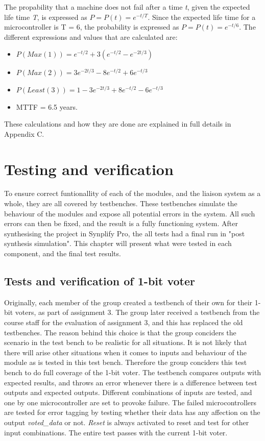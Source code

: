 \documentclass[a4paper]{IEEEtran}
\begin{document}
The propability that a machine does not fail after a time \textit{t}, given the expected life time \textit{T}, is expressed as $P = P(t) = e^{-t/T}$.
Since the expected life time for a microcontroller is T = 6, the probability is expressed as $P = P(t) = e^{-t/6}$. 
The different expressions and values that are calculated are:
\begin{itemize}
    \item $P(Max(1)) = e^{-t/2}+3(e^{-t/2}-e^{-2t/3})$
    \item $P(Max(2)) = 3e^{-2t/3}-8e^{-t/2}+6e^{-t/3}$
    \item $P(Least(3)) = 1-3e^{-2t/3}+8e^{-t/2}-6e^{-t/3}$
    \item MTTF = 6.5 years.
\end{itemize}

These calculations and how they are done are explained in full details in Appendix C.

\section{ Testing and verification }
To ensure correct funtionallity of each of the modules, and the liaison system as a whole, they are all covered by testbenches.
These testbenches simulate the behaviour of the modules and expose all potential errors in the system.
All such errors can then be fixed, and the result is a fully functioning system.
After synthesising the project in Synplify Pro, the all tests had a final run in "post synthesis simulation".
This chapter will present what were tested in each component, and the final test results.

\subsection{ Tests and verification of 1-bit voter}
Originally, each member of the group created a testbench of their own for their 1-bit voters, as part of assignment 3\protect\cite{assignment-3}.
The group later received a testbench from the course staff for the evaluation of assignment 3, and this has replaced the old testbenches.
The reason behind this choice is that the group conciders the scenario in the test bench to be realistic for all situations.
It is not likely that there will arise other situations when it comes to inputs and behaviour of the module as is tested in this test bench.
Therefore the group conciders this test bench to do full coverage of the 1-bit voter.
The testbench compares outputs with expected results, and throws an error whenever there is a difference between test outputs and expected outputs.
Different combinations of inputs are tested, and one by one microcontroller are set to provoke failure.
The failed microcontrollers are tested for error tagging by testing whether their data has any affection on the output \textit{voted\_data} or not.
\textit{Reset} is always activated to reset and test for other input combinations.
The entire test passes with the current 1-bit voter. 
\end{document}

